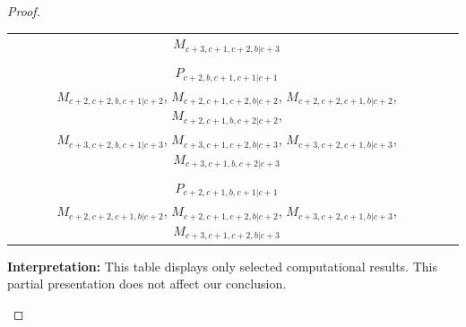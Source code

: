 \begin{proof}
\begin{enumerate}
\begin{enumerate}
\begin{enumerate}
\begin{enumerate}
\begin{table}[htbp]
\begin{tabular}{cc}
{ $M_{c+3,c+1,c+2,b|c+3}$
}\\
 & \\
 $P_{c+2,b,c+1,c+1|c+1}$ & \makecell{
 $M_{c+2,b,c+2,c+1|c+2}$,
 $M_{c+2,b,c+1,c+2|c+2}$,
 $M_{c+3,b,c+2,c+1|c+3}$,
 $M_{c+3,b,c+1,c+2|c+3}$, \\
 $M_{c+2,c+2,b,c+1|c+2}$,
 $M_{c+2,c+1,c+2,b|c+2}$,
 $M_{c+2,c+2,c+1,b|c+2}$,
 $M_{c+2,c+1,b,c+2|c+2}$, \\
 $M_{c+3,c+2,b,c+1|c+3}$,
 $M_{c+3,c+1,c+2,b|c+3}$,
 $M_{c+3,c+2,c+1,b|c+3}$,
 $M_{c+3,c+1,b,c+2|c+3}$
}\\
 & \\
 $P_{c+2,c+1,b,c+1|c+1}$ & \makecell{
 $M_{c+2,c+2,b,c+1|c+2}$,
 $M_{c+2,c+1,b,c+2|c+2}$,
 $M_{c+3,c+2,b,c+1|c+3}$,
 $M_{c+3,c+1,b,c+2|c+3}$, \\
 $M_{c+2,c+2,c+1,b|c+2}$,
 $M_{c+2,c+1,c+2,b|c+2}$,
 $M_{c+3,c+2,c+1,b|c+3}$,
 $M_{c+3,c+1,c+2,b|c+3}$
}\\
\bottomrule
\end{tabular}
\vspace{0.5em}
\parbox{\linewidth}{\small
\textbf{Interpretation:}
This table displays only selected computational results. This partial presentation does not affect our conclusion.
}
\end{table}
            \end{enumerate}

        \end{enumerate}


\end{enumerate}
\end{enumerate}
\end{proof}
